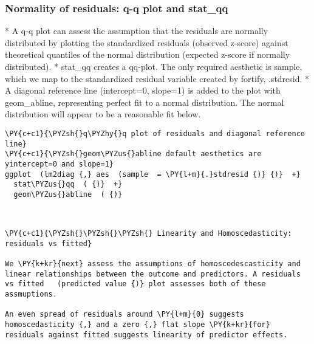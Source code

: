     
    \subsubsection{Normality of residuals: q-q plot and
stat\_qq}\label{normality-of-residuals-q-q-plot-and-statux5fqq}


* 
  A q-q plot can assess the assumption that the residuals are normally
  distributed by plotting the standardized residuals (observed z-score)
  against theoretical quantiles of the normal distribution (expected
  z-score if normally distributed).
* 
  stat\_qq creates a qq-plot. The only required aesthetic is sample,
  which we map to the standardized residual variable created by fortify,
  .stdresid.
* 
  A diagonal reference line (intercept=0, slope=1) is added to the plot
  with geom\_abline, representing perfect fit to a normal distribution.
  The normal distribution will appear to be a reasonable fit below.


    \begin{tcolorbox}[breakable, size=fbox, boxrule=1pt, pad at break*=1mm,colback=cellbackground, colframe=cellborder]
\begin{Verbatim}[commandchars=\\\{\}]
\PY{c+c1}{\PYZsh{}q\PYZhy{}q plot of residuals and diagonal reference line}
\PY{c+c1}{\PYZsh{}geom\PYZus{}abline default aesthetics are yintercept=0 and slope=1}
ggplot  (lm2diag {,} aes  (sample  = \PY{l+m}{.}stdresid {)} {)}  +} 
  stat\PYZus{}qq  ( {)}  +} 
  geom\PYZus{}abline  ( {)}
\end{Verbatim}
\end{tcolorbox}

    
    
    \begin{center}
    \end{center}
    { \hspace*{\fill} \\}
    
    \begin{tcolorbox}[breakable, size=fbox, boxrule=1pt, pad at break*=1mm,colback=cellbackground, colframe=cellborder]
\begin{Verbatim}[commandchars=\\\{\}]
\PY{c+c1}{\PYZsh{}\PYZsh{}\PYZsh{} Linearity and Homoscedasticity: residuals vs fitted}

We \PY{k+kr}{next} assess the assumptions of homoscedescasticity and linear relationships between the outcome and predictors. A residuals vs fitted   (predicted value {)} plot assesses both of these assmuptions.

An even spread of residuals around \PY{l+m}{0} suggests homoscedasticity {,} and a zero {,} flat slope \PY{k+kr}{for} residuals against fitted suggests linearity of predictor effects.
\end{Verbatim}
\end{tcolorbox}

